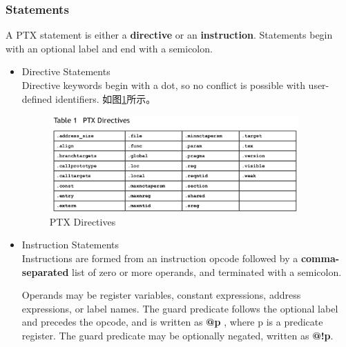 \subsubsection{Statements}
A PTX statement is either a \textbf{directive} or an \textbf{instruction}. Statements begin with an optional label and end with a semicolon.
\begin{itemize}
\item Directive Statements \\
Directive keywords begin with a dot, so no conflict is possible with user-defined
identifiers. 如图\ref{PTXDirectives}所示。
\begin{figure}[!htbp]
\centering
\includegraphics[width=0.9\textwidth]{CUDAImageProcessing/PTXDirectives}
\caption{PTX Directives}
\label{PTXDirectives}
\end{figure}
\item Instruction Statements \\
Instructions are formed from an instruction opcode followed by a \textbf{comma-separated} list
of zero or more operands, and terminated with a semicolon.

Operands may be register
variables, constant expressions, address expressions, or label names.
The guard predicate
follows the optional label and precedes the opcode, and is written as \textbf{@p} , where p is a
predicate register. The guard predicate may be optionally negated, written as \textbf{@!p}.


\end{itemize}
